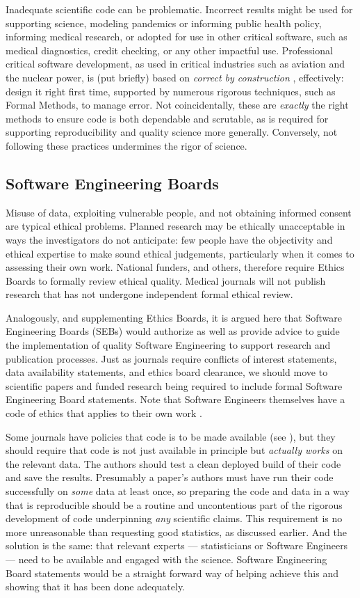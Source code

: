 \documentclass{comjnl}
\begin{document}
Inadequate scientific code can be problematic. Incorrect results might be used for supporting science, modeling pandemics or informing public health policy, informing medical research, or adopted for use in other critical software, such as medical diagnostics, credit checking, or any other impactful use. Professional critical software development, as used in critical industries such as aviation and the nuclear power, is (put briefly) based on \emph{correct by construction\/} \cite{cbc}, effectively: design it right first time, supported by numerous rigorous techniques, such as Formal Methods, to manage error. Not coincidentally, these are \emph{exactly\/} the right methods to ensure code is both dependable and scrutable, as is required for supporting reproducibility and quality science more generally. Conversely, not following these practices undermines the rigor of science. 

\subsection{Software Engineering Boards}
Misuse of data, exploiting vulnerable people, and not obtaining informed consent are typical ethical problems. Planned research may be ethically unacceptable in ways the investigators do not anticipate: few people have the objectivity and ethical expertise to make sound ethical judgements, particularly when it comes to assessing their own work. National funders, and others, therefore require Ethics Boards to formally review ethical quality. Medical journals will not publish research that has not undergone independent formal ethical review. 

Analogously, and supplementing Ethics Boards, it is argued here that Software Engineering Boards (SEBs) would authorize as well as provide advice to guide the implementation of quality Software Engineering to support research and publication processes. Just as journals require conflicts of interest statements, data availability statements, and ethics board clearance, we should move to scientific papers and funded research being required to include formal Software Engineering Board statements. Note that Software Engineers themselves have a code of ethics that applies to their own work \cite{ethics-code}.

Some journals have policies that code is to be made available (see \supplement), but they should require that code is not just available in principle but \emph{actually works\/} on the relevant data. The authors should test a clean deployed build of their code and save the results. Presumably a paper's authors must have run their code successfully on \emph{some\/} data at least once, so preparing the code and data in a way that is reproducible should be a routine and uncontentious part of the rigorous development of code underpinning \emph{any\/} scientific claims. This requirement is no more unreasonable than requesting good statistics, as discussed earlier. And the solution is the same: that relevant experts --- statisticians or Software Engineers --- need to be available and engaged with the science. Software Engineering Board statements would be a straight forward way of helping achieve this and showing that it has been done adequately.
\end{document}
